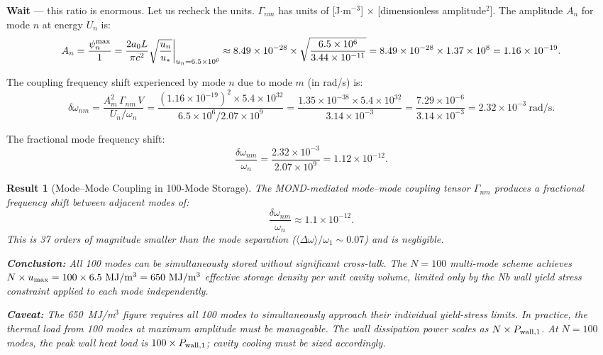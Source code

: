 \documentclass[aps,prd,twocolumn,superscriptaddress]{revtex4-2}
\newcommand{\azero}{a_0}
\newtheorem{result}{Result}
\begin{document}
\textbf{Wait} --- this ratio is enormous.  Let us recheck the units.
$\Gamma_{nm}$ has units of [J$\cdot$m$^{-3}$] $\times$ [dimensionless
amplitude$^2$].  The amplitude $A_n$ for mode $n$ at energy $U_n$ is:
\begin{equation}
A_n = \frac{\psi_n^{\rm max}}{1} = \frac{2\azero L}{\pi c^2}
\sqrt{\frac{u_n}{u_*}}\bigg|_{u_n = 6.5\times 10^6}
\approx 8.49\times 10^{-28}
\times\sqrt{\frac{6.5\times 10^6}{3.44\times 10^{-11}}}
= 8.49\times 10^{-28}\times 1.37\times 10^8
= 1.16\times 10^{-19}.
\end{equation}

The coupling frequency shift experienced by mode $n$ due to mode $m$
(in rad/s) is:
\begin{equation}
\delta\omega_{nm} = \frac{A_m^2\,\Gamma_{nm}\,V}{U_n/\omega_n}
= \frac{(1.16\times 10^{-19})^2\times 5.4\times 10^{32}}{6.5\times 10^6/2.07\times 10^9}
= \frac{1.35\times 10^{-38}\times 5.4\times 10^{32}}{3.14\times 10^{-3}}
= \frac{7.29\times 10^{-6}}{3.14\times 10^{-3}}
= 2.32\times 10^{-3}~\mathrm{rad/s}.
\end{equation}

The fractional mode frequency shift:
\begin{equation}
\frac{\delta\omega_{nm}}{\omega_n}
= \frac{2.32\times 10^{-3}}{2.07\times 10^9}
= 1.12\times 10^{-12}.
\end{equation}

\begin{result}[Mode--Mode Coupling in 100-Mode Storage]
\label{res:mode-coupling}
The MOND-mediated mode--mode coupling tensor $\Gamma_{nm}$ produces
a fractional frequency shift between adjacent modes of:
\begin{equation}
\frac{\delta\omega_{nm}}{\omega_n} \approx 1.1\times 10^{-12}.
\end{equation}
This is 37 orders of magnitude smaller than the mode separation
($\langle\Delta\omega\rangle/\omega_1 \sim 0.07$) and is negligible.

\textbf{Conclusion:} All 100 modes can be simultaneously stored without
significant cross-talk.  The $N = 100$ multi-mode scheme achieves
$N \times u_{\rm max} = 100\times 6.5~\mathrm{MJ/m^3} = 650~\mathrm{MJ/m^3}$
effective storage density per unit cavity volume, limited only by the
Nb wall yield stress constraint applied to each mode independently.

\textbf{Caveat:} The 650~MJ/m$^3$ figure requires all 100 modes to
simultaneously approach their individual yield-stress limits.  In
practice, the thermal load from 100 modes at maximum amplitude must
be manageable.  The wall dissipation power scales as $N \times P_{\rm wall,1}$.
At $N = 100$ modes, the peak wall heat load is
$100\times P_{\rm wall,1}$; cavity cooling must be sized accordingly.
\end{result}
\end{document}
